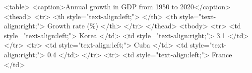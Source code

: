\documentclass[
  letterpaper,
  DIV=11,
  numbers=noendperiod,
  oneside]{scrartcl}
\newenvironment{Shaded}{\begin{snugshade}}{\end{snugshade}}
\newcommand{\DataTypeTok}[1]{\textcolor[rgb]{0.68,0.00,0.00}{#1}}
\newcommand{\KeywordTok}[1]{\textcolor[rgb]{0.00,0.23,0.31}{#1}}
\newcommand{\NormalTok}[1]{\textcolor[rgb]{0.00,0.23,0.31}{#1}}
\newcommand{\OperatorTok}[1]{\textcolor[rgb]{0.37,0.37,0.37}{#1}}
\newcommand{\OtherTok}[1]{\textcolor[rgb]{0.00,0.23,0.31}{#1}}
\newcommand{\StringTok}[1]{\textcolor[rgb]{0.13,0.47,0.30}{#1}}
\begin{document}
\begin{Shaded}
\begin{Highlighting}[]
\DataTypeTok{\textless{}}\KeywordTok{table}\DataTypeTok{\textgreater{}}
\DataTypeTok{\textless{}}\KeywordTok{caption}\DataTypeTok{\textgreater{}}\NormalTok{Annual growth in GDP from 1950 to 2020}\DataTypeTok{\textless{}/}\KeywordTok{caption}\DataTypeTok{\textgreater{}}
 \DataTypeTok{\textless{}}\KeywordTok{thead}\DataTypeTok{\textgreater{}}
  \DataTypeTok{\textless{}}\KeywordTok{tr}\DataTypeTok{\textgreater{}}
   \DataTypeTok{\textless{}}\KeywordTok{th}\OtherTok{ style}\OperatorTok{=}\StringTok{"text{-}align:left;"}\DataTypeTok{\textgreater{}}  \DataTypeTok{\textless{}/}\KeywordTok{th}\DataTypeTok{\textgreater{}}
   \DataTypeTok{\textless{}}\KeywordTok{th}\OtherTok{ style}\OperatorTok{=}\StringTok{"text{-}align:right;"}\DataTypeTok{\textgreater{}}\NormalTok{ Growth rate (\%) }\DataTypeTok{\textless{}/}\KeywordTok{th}\DataTypeTok{\textgreater{}}
  \DataTypeTok{\textless{}/}\KeywordTok{tr}\DataTypeTok{\textgreater{}}
 \DataTypeTok{\textless{}/}\KeywordTok{thead}\DataTypeTok{\textgreater{}}
\DataTypeTok{\textless{}}\KeywordTok{tbody}\DataTypeTok{\textgreater{}}
  \DataTypeTok{\textless{}}\KeywordTok{tr}\DataTypeTok{\textgreater{}}
   \DataTypeTok{\textless{}}\KeywordTok{td}\OtherTok{ style}\OperatorTok{=}\StringTok{"text{-}align:left;"}\DataTypeTok{\textgreater{}}\NormalTok{ Korea }\DataTypeTok{\textless{}/}\KeywordTok{td}\DataTypeTok{\textgreater{}}
   \DataTypeTok{\textless{}}\KeywordTok{td}\OtherTok{ style}\OperatorTok{=}\StringTok{"text{-}align:right;"}\DataTypeTok{\textgreater{}}\NormalTok{ 3.1 }\DataTypeTok{\textless{}/}\KeywordTok{td}\DataTypeTok{\textgreater{}}
  \DataTypeTok{\textless{}/}\KeywordTok{tr}\DataTypeTok{\textgreater{}}
  \DataTypeTok{\textless{}}\KeywordTok{tr}\DataTypeTok{\textgreater{}}
   \DataTypeTok{\textless{}}\KeywordTok{td}\OtherTok{ style}\OperatorTok{=}\StringTok{"text{-}align:left;"}\DataTypeTok{\textgreater{}}\NormalTok{ Cuba }\DataTypeTok{\textless{}/}\KeywordTok{td}\DataTypeTok{\textgreater{}}
   \DataTypeTok{\textless{}}\KeywordTok{td}\OtherTok{ style}\OperatorTok{=}\StringTok{"text{-}align:right;"}\DataTypeTok{\textgreater{}}\NormalTok{ 0.4 }\DataTypeTok{\textless{}/}\KeywordTok{td}\DataTypeTok{\textgreater{}}
  \DataTypeTok{\textless{}/}\KeywordTok{tr}\DataTypeTok{\textgreater{}}
  \DataTypeTok{\textless{}}\KeywordTok{tr}\DataTypeTok{\textgreater{}}
   \DataTypeTok{\textless{}}\KeywordTok{td}\OtherTok{ style}\OperatorTok{=}\StringTok{"text{-}align:left;"}\DataTypeTok{\textgreater{}}\NormalTok{ France }\DataTypeTok{\textless{}/}\KeywordTok{td}\DataTypeTok{\textgreater{}}

\end{Highlighting}
\end{Shaded}
\end{document}
